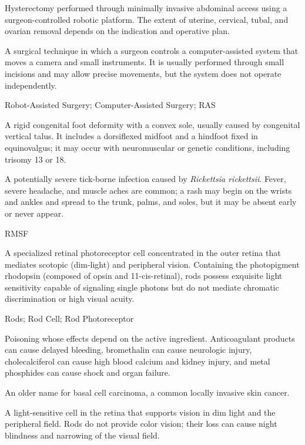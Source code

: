  Hysterectomy performed through minimally invasive abdominal access using a surgeon-controlled robotic platform. The extent of uterine, cervical, tubal, and ovarian removal depends on the indication and operative plan.

 A surgical technique in which a surgeon controls a computer-assisted system that moves a camera and small instruments. It is usually performed through small incisions and may allow precise movements, but the system does not operate independently.

\synonyms
Robot-Assisted Surgery; Computer-Assisted Surgery; RAS

 A rigid congenital foot deformity with a convex sole, usually caused by congenital vertical talus. It includes a dorsiflexed midfoot and a hindfoot fixed in equinovalgus; it may occur with neuromuscular or genetic conditions, including trisomy 13 or 18.

 A potentially severe tick-borne infection caused by \textit{Rickettsia rickettsii}. Fever, severe headache, and muscle aches are common; a rash may begin on the wrists and ankles and spread to the trunk, palms, and soles, but it may be absent early or never appear.

\synonyms
RMSF

 A specialized retinal photoreceptor cell concentrated in the outer retina that mediates scotopic (dim-light) and peripheral vision. Containing the photopigment rhodopsin (composed of opsin and 11-cis-retinal), rods possess exquisite light sensitivity capable of signaling single photons but do not mediate chromatic discrimination or high visual acuity.

\synonyms
Rods; Rod Cell; Rod Photoreceptor

 Poisoning whose effects depend on the active ingredient. Anticoagulant products can cause delayed bleeding, bromethalin can cause neurologic injury, cholecalciferol can cause high blood calcium and kidney injury, and metal phosphides can cause shock and organ failure.

 An older name for basal cell carcinoma, a common locally invasive skin cancer.

 A light-sensitive cell in the retina that supports vision in dim light and the peripheral field. Rods do not provide color vision; their loss can cause night blindness and narrowing of the visual field.

